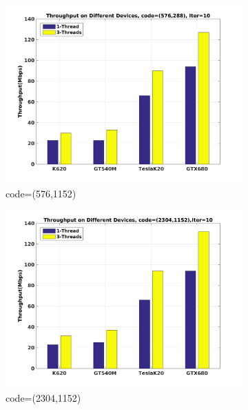 \documentclass{article}
\begin{document}
\begin{figure}[H]
  \begin{subfigure}[b]{0.6\textwidth}
    \includegraphics[width=\textwidth]{c_576_10.jpg}
    \caption{code=(576,1152)}
    \label{fig:throu_10_a}
  \end{subfigure}
  \begin{subfigure}[b]{0.6\textwidth}
    \includegraphics[width=\textwidth]{c_2304_10.jpg}
    \caption{code=(2304,1152)}
    \label{fig:throu_10_b}
  \end{subfigure}
  \\
    \begin{subfigure}[b]{0.7\textwidth}

\end{subfigure}
\end{figure}
\end{document}

